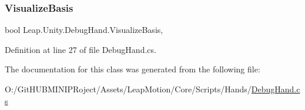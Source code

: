 \subsubsection{\texorpdfstring{VisualizeBasis}{VisualizeBasis}}
{\footnotesize\ttfamily bool Leap.\+Unity.\+Debug\+Hand.\+Visualize\+Basis\hspace{0.3cm}{\ttfamily [get]}, {\ttfamily [set]}}



Definition at line 27 of file Debug\+Hand.\+cs.



The documentation for this class was generated from the following file\+:\begin{DoxyCompactItemize}
\item 
O\+:/\+Git\+H\+U\+B\+M\+I\+N\+I\+P\+Roject/\+Assets/\+Leap\+Motion/\+Core/\+Scripts/\+Hands/\mbox{\hyperlink{_debug_hand_8cs}{Debug\+Hand.\+cs}}\end{DoxyCompactItemize}
